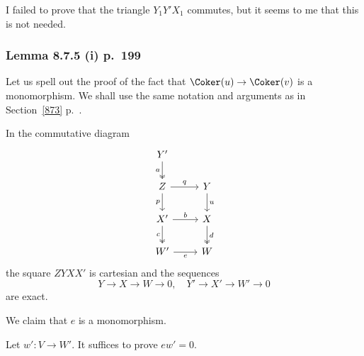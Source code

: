 \documentclass[12pt]{article}
\theoremstyle{remark}
\theoremstyle{definition}
\begin{document}
I failed to prove that the triangle $Y_1Y'X_1$ commutes, but it seems to me that this is not needed.

%

\begin{comment}

\subsubsection{Lemma 8.7.4 (ii) p. 199} 

This comment is about the claim that the natural functor $E:\DD'_\SSS\to\C$ is an equivalence. I don't understand the proof of the faithfulness of $E$ given in the book. I think that it suffices, in view of Proposition 7.1.2 (i) p.~150 and Theorem 7.1.16 p.~155 of the book, to check that 
\begin{equation}\lb{qdd}
Q:\DD'\to\C\text{ is a localization of }\DD'\text{ by }\SSS.
\end{equation} 
To prove \qr{qdd}, one can apply Lemma~\ref{711} p.~\pr{711} with $R:\C\to\DD'$ defined by $R(X):=(0\to X)$. 

\end{comment}

%

\subsubsection{Lemma 8.7.5 (i) p.~199}

Let us spell out the proof of the fact that $\Coker(u)\to\Coker(v)$ is a monomorphism. We shall use the same notation and arguments as in Section~\ref{873} p.~.

In the commutative diagram 
$$
\begin{tikzcd} 
Y'\ar[d,twoheadrightarrow,"a"']\\ 
Z\ar[d,"p"']\ar[r,"q"]&Y\ar[d,"u"]\\ 
X'\ar[d,twoheadrightarrow,"c"']\ar[r,"b"]&X\ar[d,twoheadrightarrow,"d"]\\ 
W'\ar[r,"e"']&W
\end{tikzcd}
$$ 
the square $ZYXX'$ is cartesian and the sequences 
$$
Y\to X\to W\to0,\quad Y'\to X'\to W'\to0
$$ 
are exact. 

We claim that $e$ is a monomorphism.

Let $w':V\to W'$. It suffices to prove $ew'=0$. 
\end{document}
